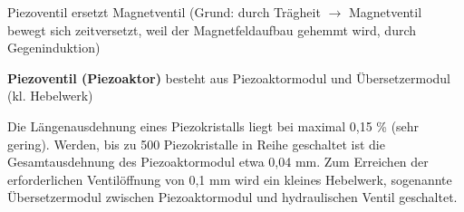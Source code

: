 Piezoventil ersetzt Magnetventil (Grund: durch Trägheit $\to$
Magnetventil bewegt sich zeitversetzt, weil der Magnetfeldaufbau gehemmt
wird, durch Gegeninduktion)

\textbf{Piezoventil (Piezoaktor)} besteht aus Piezoaktormodul und
Übersetzermodul (kl. Hebelwerk)

Die Längenausdehnung eines Piezokristalls liegt bei maximal 0,15 \%
(sehr gering). Werden, bis zu 500 Piezokristalle in Reihe geschaltet ist
die Gesamtausdehnung des Piezoaktormodul etwa 0,04 mm. Zum Erreichen der
erforderlichen Ventilöffnung von 0,1 mm wird ein kleines Hebelwerk,
sogenannte Übersetzermodul zwischen Piezoaktormodul und hydraulischen
Ventil geschaltet.
